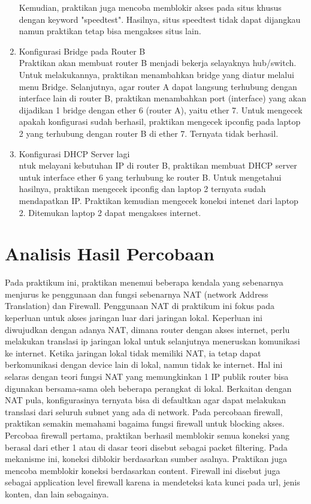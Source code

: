 \begin{enumerate}
  Kemudian, praktikan juga mencoba memblokir akses pada situs khusus dengan keyword "speedtest". Hasilnya, situs speedtest tidak dapat dijangkau namun praktikan tetap bisa mengakses situs lain. 
  \item Konfigurasi Bridge pada Router B \\
  Praktikan akan membuat router B menjadi bekerja selayaknya hub/switch. Untuk melakukannya, praktikan menambahkan bridge yang diatur melalui menu Bridge. Selanjutnya, agar router A dapat langsung terhubung dengan interface lain di router B, praktikan menambahkan port (interface) yang akan dijadikan 1 bridge dengan ether 6 (router A), yaitu ether 7. Untuk mengecek apakah konfigurasi sudah berhasil, praktikan mengecek ipconfig pada laptop 2 yang terhubung dengan router B di ether 7. Ternyata tidak berhasil. 
  \item Konfigurasi DHCP Server lagi \\
  ntuk melayani kebutuhan IP di router B, praktikan membuat DHCP server untuk interface ether 6 yang terhubung ke router B. Untuk mengetahui hasilnya, praktikan mengecek ipconfig dan laptop 2 ternyata sudah mendapatkan IP. Praktikan kemudian mengecek koneksi intenet dari laptop 2. Ditemukan laptop 2 dapat mengakses internet.
\end{enumerate}

\section{Analisis Hasil Percobaan}
Pada praktikum ini, praktikan menemui beberapa kendala yang sebenarnya menjurus ke penggunaan dan fungsi sebenarnya NAT (network Address Translation) dan Firewall. Penggunaan NAT di praktikum ini fokus pada keperluan untuk akses jaringan luar dari jaringan lokal. Keperluan ini diwujudkan dengan adanya NAT, dimana router dengan akses internet, perlu melakukan translasi ip jaringan lokal untuk selanjutnya meneruskan komunikasi ke internet. Ketika jaringan lokal tidak memiliki NAT, ia tetap dapat berkomunikasi dengan device lain di lokal, namun tidak ke internet. Hal ini selaras dengan teori fungsi NAT yang memungkinkan 1 IP publik router bisa digunakan bersama-sama oleh beberapa perangkat di lokal. Berkaitan dengan NAT pula, konfigurasinya ternyata bisa di defaultkan agar dapat melakukan translasi dari seluruh subnet yang ada di network. Pada percobaan firewall, praktikan semakin memahami bagaima fungsi firewall untuk blocking akses.  Percobaa firewall pertama, praktikan berhasil memblokir semua koneksi yang berasal dari ether 1 atau di dasar teori disebut sebagai packet filtering. Pada mekanisme ini, koneksi diblokir berdasarkan sumber asalnya. Praktikan juga mencoba memblokir koneksi berdasarkan content. Firewall ini disebut juga sebagai application level firewall karena ia mendeteksi kata kunci pada url, jenis konten, dan lain sebagainya.

